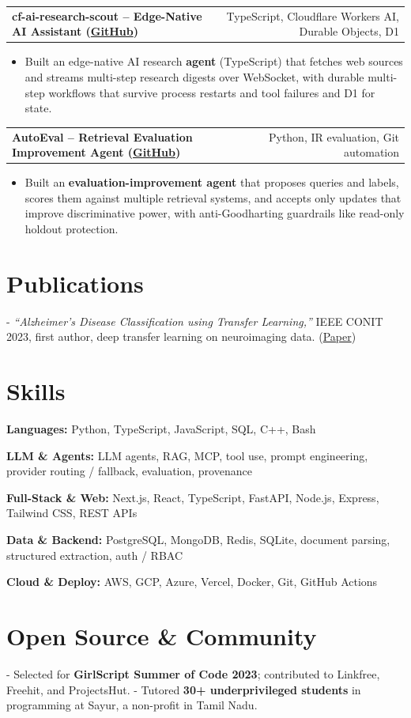 \documentclass[letterpaper,11pt]{article}
\makeatletter
\newcommand{\projItem}[2]{%
  \vspace{2pt}
  \begin{tabular*}{\textwidth}{@{}l@{\extracolsep{\fill}}r@{}}
    \textbf{#1} & #2 \\
  \end{tabular*}\par\vspace{-3pt}
}
\newcommand{\skillLine}[2]{\textbf{#1:} #2\par\vspace{1.5pt}}
\newcommand{\inlineBlock}[1]{{\setlength{\leftskip}{0.18in}\small #1\par}}
\makeatother
\begin{document}
\projItem{cf-ai-research-scout -- Edge-Native AI Assistant {\normalfont\small(\href{https://github.com/Deva-1903/cf_ai_research_scout}{GitHub})}}{TypeScript, Cloudflare Workers AI, Durable Objects, D1}
\begin{itemize}
  \item Built an edge-native AI research \textbf{agent} (TypeScript) that fetches web sources and streams multi-step research digests over WebSocket, with durable multi-step workflows that survive process restarts and tool failures and D1 for state.
\end{itemize}

\projItem{AutoEval -- Retrieval Evaluation Improvement Agent {\normalfont\small(\href{https://github.com/Deva-1903/AutoEval}{GitHub})}}{Python, IR evaluation, Git automation}
\begin{itemize}
  \item Built an \textbf{evaluation-improvement agent} that proposes queries and labels, scores them against multiple retrieval systems, and accepts only updates that improve discriminative power, with anti-Goodharting guardrails like read-only holdout protection.
\end{itemize}

\section{Publications}
\vspace{2pt}
\inlineBlock{- \textit{``Alzheimer's Disease Classification using Transfer Learning,''} IEEE CONIT 2023, first author, deep transfer learning on neuroimaging data. {\normalfont\small(\href{https://ieeexplore.ieee.org/document/10205760}{Paper})}}

\section{Skills}
\skillLine{Languages}{Python, TypeScript, JavaScript, SQL, C++, Bash}
\skillLine{LLM \& Agents}{LLM agents, RAG, MCP, tool use, prompt engineering, provider routing / fallback, evaluation, provenance}
\skillLine{Full-Stack \& Web}{Next.js, React, TypeScript, FastAPI, Node.js, Express, Tailwind CSS, REST APIs}
\skillLine{Data \& Backend}{PostgreSQL, MongoDB, Redis, SQLite, document parsing, structured extraction, auth / RBAC}
\skillLine{Cloud \& Deploy}{AWS, GCP, Azure, Vercel, Docker, Git, GitHub Actions}

\section{Open Source \& Community}
\inlineBlock{- Selected for \textbf{GirlScript Summer of Code 2023}; contributed to Linkfree, Freehit, and ProjectsHut. - Tutored \textbf{30+ underprivileged students} in programming at Sayur, a non-profit in Tamil Nadu.}
\end{document}
